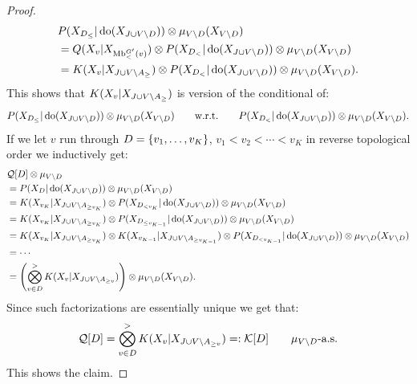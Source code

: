 \begin{Thm}
\begin{proof}
\begin{align*}
            & P(X_{D_\le}|\operatorname{do}(X_{J \cup V \setminus D})) \otimes \mu_{V\setminus D}(X_{V \setminus D}) \\
        & = Q(X_v|X_{\mathrm{Mb}^{G'}_<(v)}) \otimes P(X_{D_<}|\operatorname{do}(X_{J \cup V \setminus D})) \otimes \mu_{V\setminus D}(X_{V \setminus D}) \\
        & = K(X_v|X_{J \cup V \setminus A_\ge}) \otimes P(X_{D_<}|\operatorname{do}(X_{J \cup V \setminus D})) \otimes \mu_{V\setminus D}(X_{V \setminus D}).
    \end{align*}
       This shows that $K(X_v|X_{J \cup V \setminus A_\ge})$ is version of the conditional of:
               \[ P(X_{D_\le}|\operatorname{do}(X_{J \cup V \setminus D})) \otimes \mu_{V\setminus D}(X_{V\setminus D}) \qquad \text{w.r.t.} \qquad
        P(X_{D_<}|\operatorname{do}(X_{J \cup V \setminus D})) \otimes \mu_{V\setminus D}(X_{V\setminus D}). \] 
       If we let $v$ run through $D = \left \{ v_1,\dots,v_K \right \}$, $v_1 < v_2 < \cdots < v_K$ 
       in reverse topological order we inductively get:
       \begin{align*}
           & \mathcal{Q}[D] \otimes \mu_{V\setminus D} \\
           &= P(X_D|\operatorname{do}(X_{J \cup V \setminus D})) \otimes \mu_{V\setminus D}(X_{V\setminus D}) \\
           &= K(X_{v_K}|X_{J \cup V \setminus A_{\ge v_K}}) \otimes P(X_{D_{< v_{K}}}|\operatorname{do}(X_{J \cup V \setminus D})) \otimes \mu_{V\setminus D}(X_{V\setminus D})\\ 
           &= K(X_{v_K}|X_{J \cup V \setminus A_{\ge v_K}}) \otimes P(X_{D_{\le v_{K-1}}}|\operatorname{do}(X_{J \cup V \setminus D})) \otimes \mu_{V\setminus D}(X_{V\setminus D})\\ 
           &= K(X_{v_K}|X_{J \cup V \setminus A_{\ge v_K}}) \otimes  K(X_{v_{K-1}}|X_{J \cup V \setminus A_{\ge v_{K-1}}}) \otimes P(X_{D_{< v_{K-1}}}|\operatorname{do}(X_{J \cup V \setminus D})) \otimes \mu_{V\setminus D}(X_{V\setminus D})\\ 
           & = \cdots\\
           &= \left ( \bigotimes_{v \in D}^> K(X_v|X_{J \cup V \setminus A_{\ge v}}) \right ) \otimes \mu_{V\setminus D}(X_{V\setminus D}). 
       \end{align*}
       Since such factorizations are essentially unique we get that:
       \[ \mathcal{Q}[D] = \bigotimes_{v \in D}^> K(X_v|X_{J \cup V \setminus A_{\ge v}}) =: \mathcal{K}[D] \qquad \mu_{V\setminus D}\text{-a.s.}  \]
       This shows the claim.


\end{proof}
\end{Thm}
